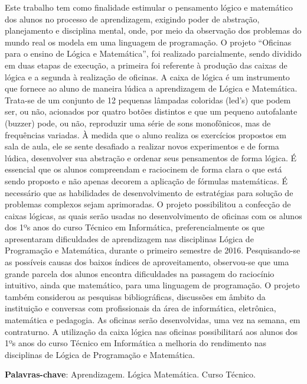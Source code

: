 \documentclass[article,12pt,onesidea,4paper,english,brazil]{abntex2}
\begin{document}
	\noindent Este trabalho tem como finalidade estimular o pensamento lógico e matemático dos alunos no processo de aprendizagem, exigindo poder de abstração, planejamento e disciplina mental, onde, por meio da observação dos problemas do mundo real  os modela em uma linguagem de programação. O projeto “Oficinas para o ensino de Lógica e Matemática”, foi realizado parcialmente, sendo  dividido em duas etapas de execução, a primeira foi referente à produção  das caixas de lógica e a segunda à realização de oficinas.   A caixa de lógica é um instrumento que fornece ao aluno de maneira lúdica a aprendizagem de Lógica e Matemática. Trata-se de um conjunto de 12 pequenas lâmpadas coloridas (led’s) que podem ser, ou não, acionados por quatro botões distintos e que um pequeno autofalante (buzzer) pode, ou não, reproduzir uma série de sons monofônicos, mas de frequências variadas. À medida que o aluno realiza os exercícios propostos em sala de aula, ele se sente desafiado a realizar novos experimentos e de forma lúdica, desenvolver sua abstração e ordenar seus pensamentos de forma lógica. É essencial que os alunos compreendam e raciocinem de forma clara o que está sendo proposto e não apenas decorem a aplicação de fórmulas matemáticas. É necessário que as habilidades de desenvolvimento de estratégias para solução de problemas complexos sejam aprimoradas. O projeto possibilitou a confecção de caixas lógicas, as quais serão usadas no desenvolvimento de oficinas com os alunos dos 1ºs anos do curso Técnico em Informática, preferencialmente os que apresentaram dificuldades de aprendizagem nas disciplinas Lógica de Programação e Matemática, durante o primeiro semestre de 2016. Pesquisando-se as possíveis causas dos baixos índices de aproveitamento, observou-se que uma grande parcela dos alunos encontra dificuldades na passagem do raciocínio intuitivo, ainda que matemático, para uma linguagem de programação. O projeto também considerou as pesquisas bibliográficas, discussões em âmbito da instituição e conversas com profissionais da área de informática, eletrônica, matemática e pedagogia.  As oficinas serão desenvolvidas, uma vez na semana, em contraturno.  A utilização da caixa lógica  nas oficinas possibilitará  aos alunos dos 1ºs anos do curso Técnico em Informática a melhoria do rendimento nas disciplinas  de Lógica de Programação e Matemática.
	
	\vspace{\onelineskip}
	
	\noindent
	\textbf{Palavras-chave}: Aprendizagem. Lógica Matemática. Curso Técnico.
	
\end{document}
